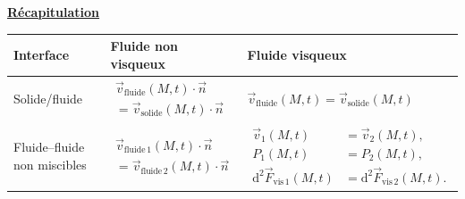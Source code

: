 \documentclass[11pt,a4paper]{article}
\newcommand{\dd}{\mathrm d}
\newcommand{\vv}{\vec v}
\newcommand{\titr}[1]{\par\needspace{4\baselineskip}\textbf{\underline{#1}}\par}
\begin{document}
\titr{Récapitulation}
\begingroup\small\renewcommand{\arraystretch}{1.7}
\begin{tabularx}{\linewidth}{p{.18\linewidth}|X|X}
\textbf{Interface}&\textbf{Fluide non visqueux}&\textbf{Fluide visqueux}\\\hline
Solide/fluide&$\begin{aligned}\vv_{\mathrm{fluide}}(M,t)\cdot\vec n\\=\vv_{\mathrm{solide}}(M,t)\cdot\vec n\end{aligned}$&$\vv_{\mathrm{fluide}}(M,t)=\vv_{\mathrm{solide}}(M,t)$\\\hline
Fluide--fluide non miscibles&$\begin{aligned}\vv_{\mathrm{fluide}\,1}(M,t)\cdot\vec n\\=\vv_{\mathrm{fluide}\,2}(M,t)\cdot\vec n\end{aligned}$&$\begin{aligned}\vv_1(M,t)&=\vv_2(M,t),\\P_1(M,t)&=P_2(M,t),\\\dd^2\vec F_{\mathrm{vis}\,1}(M,t)&=\dd^2\vec F_{\mathrm{vis}\,2}(M,t).\end{aligned}$
\end{tabularx}\endgroup
\end{document}
